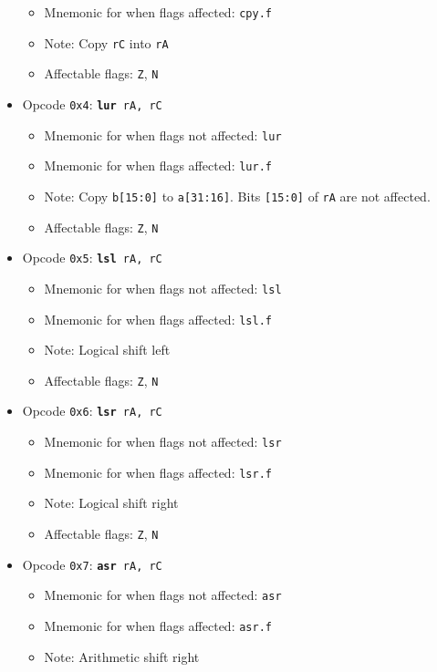 \documentclass{article}
\begin{document}
\begin{itemize}
\begin{itemize}
			\item Mnemonic for when flags affected:  \texttt{cpy.f}
			\item Note:  Copy \texttt{rC} into \texttt{rA}
			\item Affectable flags:
				\texttt{Z}, \texttt{N}
		\end{itemize}
		\item Opcode \texttt{0x4}:
			\texttt{\textbf{lur} rA, rC}
		\begin{itemize}
			\item Mnemonic for when flags not affected:  \texttt{lur}
			\item Mnemonic for when flags affected:  \texttt{lur.f}
			\item Note:  Copy \texttt{b[15:0]} to \texttt{a[31:16]}.
			Bits \texttt{[15:0]} of \texttt{rA} are not affected.
			\item Affectable flags:
				\texttt{Z}, \texttt{N}
		\end{itemize}
		\item Opcode \texttt{0x5}:
			\texttt{\textbf{lsl} rA, rC}
		\begin{itemize}
			\item Mnemonic for when flags not affected:  \texttt{lsl}
			\item Mnemonic for when flags affected:  \texttt{lsl.f}
			\item Note:  Logical shift left
			\item Affectable flags:
				\texttt{Z}, \texttt{N}
		\end{itemize}
		\item Opcode \texttt{0x6}:
			\texttt{\textbf{lsr} rA, rC}
		\begin{itemize}
			\item Mnemonic for when flags not affected:  \texttt{lsr}
			\item Mnemonic for when flags affected:  \texttt{lsr.f}
			\item Note:  Logical shift right
			\item Affectable flags:
				\texttt{Z}, \texttt{N}
		\end{itemize}
		\item Opcode \texttt{0x7}:
			\texttt{\textbf{asr} rA, rC}
		\begin{itemize}
			\item Mnemonic for when flags not affected:  \texttt{asr}
			\item Mnemonic for when flags affected:  \texttt{asr.f}
			\item Note:  Arithmetic shift right

\end{itemize}
\end{itemize}
\end{document}
